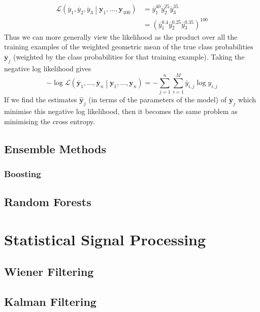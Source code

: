 \documentclass[11pt]{report} %
\begin{document}
\begin{align}
\mathcal{L}\left(\overline{y}_{1}, \overline{y}_{2}, \overline{y}_{3}\middle|\mathbf{y}_{1}, \dots, \mathbf{y}_{100}\right) &= \overline{y}_{1}^{40}\overline{y}_{2}^{25}\overline{y}_{3}^{35} \\
&= \left(\overline{y}_{1}^{0.4}\overline{y}_{2}^{0.25}\overline{y}_{3}^{0.35}\right)^{100}
\end{align}
Thus we can more generally view the likelihood as the product over all the training examples of the weighted geometric mean of the true class probabilities $\overline{\mathbf{y}}_{j}$ (weighted by the class probabilities for that training example). Taking the negative log likelihood gives
\begin{equation}
-\log\mathcal{L}\left(\overline{\mathbf{y}}_{1}, \dots, \overline{\mathbf{y}}_{n}\middle|\mathbf{y}_{1}, \dots, \mathbf{y}_{n}\right) = -\sum_{j = 1}^{n}\sum_{i = 1}^{M}\overline{y}_{i, j}\log{y_{i, j}}
\end{equation}
If we find the estimates $\hat{\mathbf{y}}_{j}$ (in terms of the parameters of the model) of $\overline{\mathbf{y}}_{j}$ which minimise this negative log likelihood, then it becomes the same problem as minimising the cross entropy.

\section{Ensemble Methods}

\subsection{Boosting}

\section{Random Forests}



\chapter{Statistical Signal Processing}

\section{Wiener Filtering}

\section{Kalman Filtering}
\end{document}
